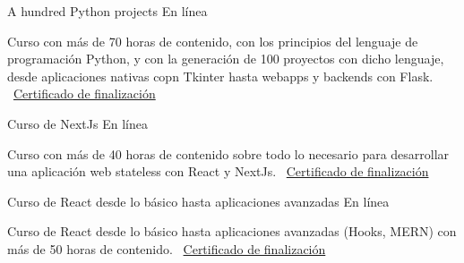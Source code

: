 \documentclass[]{awesome-cv}
\begin{document}
\vspace{25mm}
\begin{cventries}
	\vspace{2mm}
    \cventry
	{}
	{A hundred Python projects \vspace{-4mm}}
	{En línea \vspace{-5mm}}
	{}
	{\begin{cvsectionnormaltext} 
		\item{Curso con más de 70 horas de contenido, con los principios del lenguaje de programación Python, y con la generación de 100 proyectos con dicho lenguaje, desde aplicaciones nativas copn Tkinter hasta webapps y backends con Flask.
		\newline \vspace{2mm} \faLink\ \href{https://www.udemy.com/certificate/UC-2d01021e-af92-434c-a4a3-7fc7b33976c9/}{Certificado de finalización}}
	\end{cvsectionnormaltext}}
    {}
    
	\cventry
	{}
	{Curso de NextJs \vspace{-4mm}}
	{En línea \vspace{-5mm}}
	{}
	{\begin{cvsectionnormaltext} 
		\item{Curso con más de 40 horas de contenido sobre todo lo necesario para desarrollar una aplicación web stateless con React y NextJs.
		\newline \vspace{2mm} \faLink\ \href{https://www.udemy.com/certificate/UC-1ede8757-aa0d-406f-813a-8eaa400532c5/}{Certificado de finalización}}
	\end{cvsectionnormaltext}}
    {}

	\cventry
	{}
	{Curso de React desde lo básico hasta aplicaciones avanzadas \vspace{-4mm}}
	{En línea \vspace{-5mm}}
	{}
	{\begin{cvsectionnormaltext} 
		\item{Curso de React desde lo básico hasta aplicaciones avanzadas (Hooks, MERN) con más de 50 horas de contenido.
		\newline \vspace{2mm} \faLink\ \href{https://www.udemy.com/certificate/UC-fcb467ab-c089-419c-9b6a-afe97f894d14/}{Certificado de finalización}}
	\end{cvsectionnormaltext}}
    {}


\end{cventries}
\end{document}
